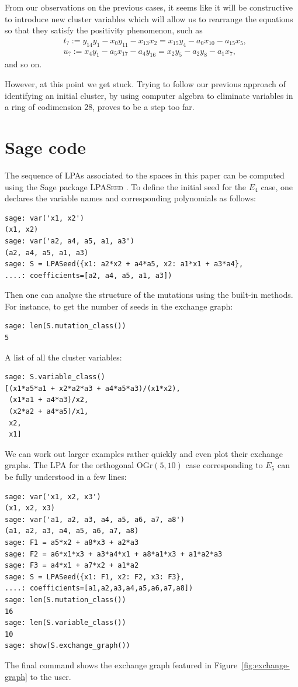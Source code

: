 \documentclass[pdftex]{sigma}
\numberwithin{equation}{section}
\theoremstyle{definition}
\begin{document}
From our observations on the previous cases, it seems like it will be constructive to introduce new cluster variables which will allow us to rearrange the equations so that they satisfy the positivity phenomenon, such as
\begin{align*}
&t_?:= y_{14}y_1 - x_0y_{11} - x_{13}x_2 = x_{15}y_4 - a_0x_{10} - a_{15}x_5, \\
&u_?:= x_4y_1 - a_5x_{17} -a_4y_{16} = x_2y_5 - a_2y_8 - a_1x_7,
\end{align*}
and so on.

However, at this point we get stuck. Trying to follow our previous approach of identifying an initial cluster, by using computer algebra to eliminate variables in a ring of codimension 28, proves to be a step too far.

\appendix

\section{Sage code} \label{appendixA}
The sequence of LPAs associated to the spaces in this paper can be computed using the Sage package \textsc{LPASeed} \cite{sagecode}. To define the initial seed for the $E_4$ case, one declares the variable names and corresponding polynomials as follows:
\begin{lstlisting}
sage: var('x1, x2')
(x1, x2)
sage: var('a2, a4, a5, a1, a3')
(a2, a4, a5, a1, a3)
sage: S = LPASeed({x1: a2*x2 + a4*a5, x2: a1*x1 + a3*a4},
....: coefficients=[a2, a4, a5, a1, a3])
\end{lstlisting}

Then one can analyse the structure of the mutations using the built-in methods. For instance, to get the number of seeds in the exchange graph:
\begin{lstlisting}
sage: len(S.mutation_class())
5
\end{lstlisting}

A list of all the cluster variables:
\begin{lstlisting}
sage: S.variable_class()
[(x1*a5*a1 + x2*a2*a3 + a4*a5*a3)/(x1*x2),
 (x1*a1 + a4*a3)/x2,
 (x2*a2 + a4*a5)/x1,
 x2,
 x1]
\end{lstlisting}

We can work out larger examples rather quickly and even plot their exchange graphs. The LPA for the orthogonal $\text{OGr}(5, 10)$ case corresponding to $E_5$ can be fully understood in a few lines:
\begin{lstlisting}
sage: var('x1, x2, x3')
(x1, x2, x3)
sage: var('a1, a2, a3, a4, a5, a6, a7, a8')
(a1, a2, a3, a4, a5, a6, a7, a8)
sage: F1 = a5*x2 + a8*x3 + a2*a3
sage: F2 = a6*x1*x3 + a3*a4*x1 + a8*a1*x3 + a1*a2*a3
sage: F3 = a4*x1 + a7*x2 + a1*a2
sage: S = LPASeed({x1: F1, x2: F2, x3: F3},
....: coefficients=[a1,a2,a3,a4,a5,a6,a7,a8])
sage: len(S.mutation_class())
16
sage: len(S.variable_class())
10
sage: show(S.exchange_graph())
\end{lstlisting}
The final command shows the exchange graph featured in Figure~\ref{fig:exchange-graph} to the user.
\end{document}
